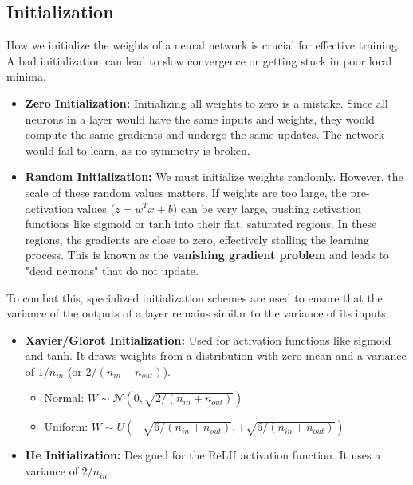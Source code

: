 \documentclass{article}
\begin{document}
\begin{multicols}{2}
\subsection{Initialization}
How we initialize the weights of a neural network is crucial for effective training. A bad initialization can lead to slow convergence or getting stuck in poor local minima.
\begin{itemize}
    \item \textbf{Zero Initialization:} Initializing all weights to zero is a mistake. Since all neurons in a layer would have the same inputs and weights, they would compute the same gradients and undergo the same updates. The network would fail to learn, as no symmetry is broken.
    \item \textbf{Random Initialization:} We must initialize weights randomly. However, the scale of these random values matters. If weights are too large, the pre-activation values ($z = w^T x + b$) can be very large, pushing activation functions like sigmoid or tanh into their flat, saturated regions. In these regions, the gradients are close to zero, effectively stalling the learning process. This is known as the \textbf{vanishing gradient problem} and leads to "dead neurons" that do not update.
\end{itemize}

To combat this, specialized initialization schemes are used to ensure that the variance of the outputs of a layer remains similar to the variance of its inputs.
\begin{itemize}
    \item \textbf{Xavier/Glorot Initialization:} Used for activation functions like sigmoid and tanh. It draws weights from a distribution with zero mean and a variance of $1/n_{in}$ (or $2/(n_{in} + n_{out})$).
    \begin{itemize}
        \item Normal: $W \sim \mathcal{N}(0, \sqrt{2/(n_{in} + n_{out})})$
        \item Uniform: $W \sim U(-\sqrt{6/(n_{in} + n_{out})}, +\sqrt{6/(n_{in} + n_{out})})$
    \end{itemize}
    \item \textbf{He Initialization:} Designed for the ReLU activation function. It uses a variance of $2/n_{in}$.
\end{itemize}


\end{multicols}
\end{document}
